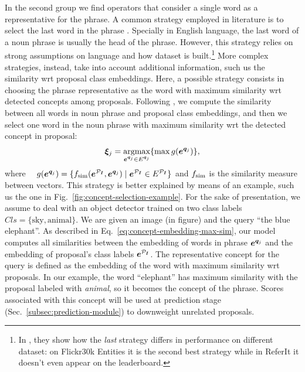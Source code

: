 In the second group we find operators that consider a single word as a
representative for the phrase. A common strategy employed in
literature is to select the last word in the phrase
\cite{wang2019phrase}. Specially in English language, the last word of
a noun phrase is usually the head of the phrase. However, this
strategy relies on strong assumptions on language and how dataset is
built.\footnote{In \cite{wang2019phrase}, they show how the
\textit{last} strategy differs in performance on different dataset: on
Flickr30k Entities it is the second best strategy while in ReferIt it
doesn't even appear on the
leaderboard.} More complex strategies,
instead, take into account additional information, such us the
similarity wrt proposal class embeddings. Here, a possible strategy
consists in choosing the phrase representative as the word with
maximum similarity wrt detected concepts among proposals. Following
\cite{wang2019phrase}, we compute the similarity between all words in
noun phrase and proposal class embeddings, and then we select one word
in the noun phrase with maximum similarity wrt the detected concept in
proposal:
\begin{equation}
  \bm{\xi}_j = \operatorname*{argmax}_{\bm{e}^{\bm{q}_j} \in E^{\bm{q}_j}} \{ \max g(\bm{e}^{\bm{q}_j}) \},
  \label{eq:concept-embedding-max-sim}
\end{equation}
where $\quad g(\bm{e}^{\bm{q}_j}) = \{ f_{\text{sim}}(\bm{e}^{\mathcal{P}_{\bm{I}}}, \bm{e}^{\bm{q}_j}) \mid \bm{e}^{\mathcal{P}_{\bm{I}}} \in E^{\mathcal{P}_{\bm{I}}} \}$ and
$f_{\text{sim}}$ is the similarity measure between vectors. This strategy is
better explained by means of an example, such us the one in
Fig.~\ref{fig:concept-selection-example}. For the sake of
presentation, we assume to deal with an object detector trained on two
class labels $Cls = \{ \text{sky}, \text{animal} \}$. We are given an
image (in figure) and the query ``the blue elephant''. As described in
Eq.~\ref{eq:concept-embedding-max-sim}, our model computes all
similarities between the embedding of words in phrase $\bm{e}^{\bm{q}_j}$ and the
embedding of proposal's class labels $\bm{e}^{\mathcal{P}_{\bm{I}}}$. The representative
concept for the query is defined as the embedding of the word with
maximum similarity wrt proposals. In our example, the word
``elephant'' has maximum similarity with the proposal labeled with
\textit{animal}, so it becomes the concept of the phrase. Scores
associated with this concept will be used at prediction stage
(Sec.~\ref{subsec:prediction-module}) to downweight unrelated
proposals.

